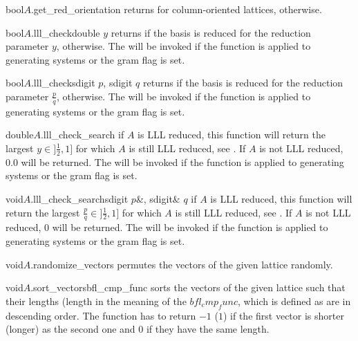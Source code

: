 \begin{fcode}{bool}{$A$.get_red_orientation}{}
  returns \TRUE for column-oriented lattices, \FALSE otherwise.
\end{fcode}

\begin{fcode}{bool}{$A$.lll_check}{double $y$}
  returns \TRUE if the basis is reduced for the reduction parameter $y$, \FALSE otherwise.  The
  \LEH will be invoked if the function is applied to generating systems or the gram flag is set.
\end{fcode}

\begin{fcode}{bool}{$A$.lll_check}{sdigit $p$, sdigit $q$}
  returns \TRUE if the basis is reduced for the reduction parameter $\frac{p}{q}$, \FALSE
  otherwise.  The \LEH will be invoked if the function is applied to generating systems or the
  gram flag is set.
\end{fcode}

\begin{fcode}{double}{$A$.lll_check_search}{}
  if $A$ is LLL reduced, this function will return the largest $y\in ]\frac{1}{2},1]$ for which
  $A$ is still LLL reduced, see \cite{LenstraAK/LenstraHW/Lovasz:1982,Schnorr/Euchner:1994}.  If
  $A$ is not LLL reduced, $0.0$ will be returned.  The \LEH will be invoked if the function is
  applied to generating systems or the gram flag is set.
\end{fcode}

\begin{fcode}{void}{$A$.lll_check_search}{sdigit $p$&, sdigit& $q$}
  if $A$ is LLL reduced, this function will return the largest $\frac{p}{q}\in ]\frac{1}{2},1]$
  for which $A$ is still LLL reduced, see \cite{LenstraAK/LenstraHW/Lovasz:1982,
    Schnorr/Euchner:1994}.  If $A$ is not LLL reduced, 0 will be returned.  The \LEH will be
  invoked if the function is applied to generating systems or the gram flag is set.
\end{fcode}

\begin{fcode}{void}{$A$.randomize_vectors}{}
  permutes the vectors of the given lattice randomly.
\end{fcode}

\begin{fcode}{void}{$A$.sort_vectors}{bfl_cmp_func}
  sorts the vectors of the given lattice such that their lengths (length in the meaning of the
  $bfl_cmp_func$, which is defined as  are in descending order.  The function  has to return
  $-1$ ($1$) if the first vector is shorter (longer) as the second one and $0$ if they have the
  same length.
\end{fcode}

